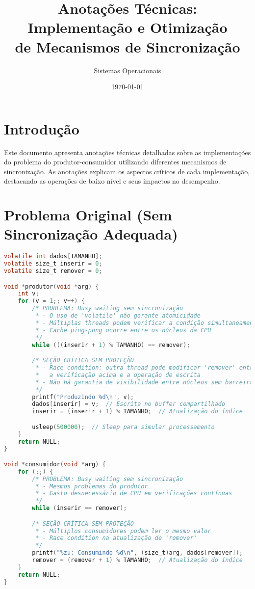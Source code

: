 \documentclass[12pt]{article}
\title{Anotações Técnicas: Implementação e Otimização\\de Mecanismos de Sincronização}
\author{Sistemas Operacionais}
\date{\today}
\begin{document}
\maketitle

\section{Introdução}

Este documento apresenta anotações técnicas detalhadas sobre as implementações do problema do produtor-consumidor utilizando diferentes mecanismos de sincronização. As anotações explicam os aspectos críticos de cada implementação, destacando as operações de baixo nível e seus impactos no desempenho.

\section{Problema Original (Sem Sincronização Adequada)}

\begin{lstlisting}[language=C, caption=Implementação Original com Problemas]
volatile int dados[TAMANHO];
volatile size_t inserir = 0;
volatile size_t remover = 0;

void *produtor(void *arg) {
    int v;
    for (v = 1;; v++) {
        /* PROBLEMA: Busy waiting sem sincronização
         * - O uso de 'volatile' não garante atomicidade
         * - Múltiplas threads podem verificar a condição simultaneamente
         * - Cache ping-pong ocorre entre os núcleos da CPU
         */
        while (((inserir + 1) % TAMANHO) == remover);

        /* SEÇÃO CRÍTICA SEM PROTEÇÃO
         * - Race condition: outra thread pode modificar 'remover' entre
         *   a verificação acima e a operação de escrita
         * - Não há garantia de visibilidade entre núcleos sem barreira de memória
         */
        printf("Produzindo %d\n", v);
        dados[inserir] = v;  // Escrita no buffer compartilhado
        inserir = (inserir + 1) % TAMANHO;  // Atualização do índice

        usleep(500000);  // Sleep para simular processamento
    }
    return NULL;
}

void *consumidor(void *arg) {
    for (;;) {
        /* PROBLEMA: Busy waiting sem sincronização
         * - Mesmos problemas do produtor
         * - Gasto desnecessário de CPU em verificações contínuas
         */
        while (inserir == remover);

        /* SEÇÃO CRÍTICA SEM PROTEÇÃO
         * - Múltiplos consumidores podem ler o mesmo valor
         * - Race condition na atualização de 'remover'
         */
        printf("%zu: Consumindo %d\n", (size_t)arg, dados[remover]);
        remover = (remover + 1) % TAMANHO;  // Atualização do índice
    }
    return NULL;
}
\end{lstlisting}
\end{document}
